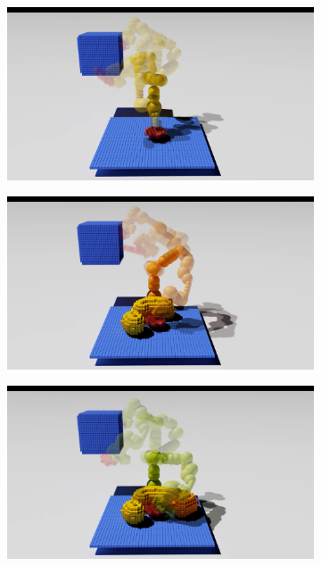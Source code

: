 \documentclass[a4paper]{report}
\begin{document}
\begin{figure}[t]
    \centering
    \begin{subfigure}{0.48\textwidth}
        \includegraphics[trim={8cm 0 10cm 1cm},clip, width=\textwidth]{path1.png}
        \caption{}
        \label{fig:pr1}
    \end{subfigure} 
    \begin{subfigure}{0.48\textwidth}
        \includegraphics[trim={8cm 0 10cm 1cm},clip, width=\textwidth]{path2.png}
        \caption{}
        \label{fig:pr2}
    \end{subfigure}
    \begin{subfigure}{0.48\textwidth}
        \includegraphics[trim={8cm 0 10cm 1cm},clip, width=\textwidth]{path3.png}

\end{subfigure}
\end{figure}
\end{document}
